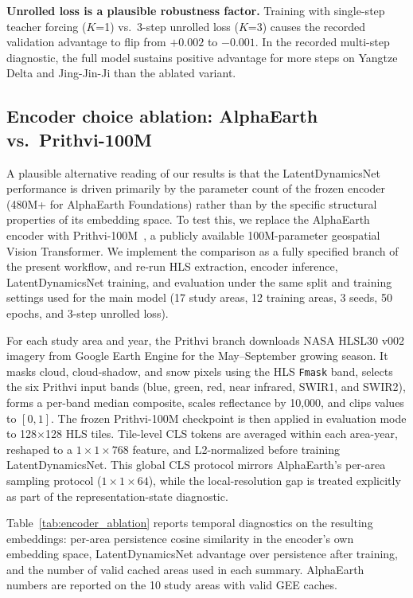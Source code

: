 \documentclass{article}
\begin{document}
\textbf{Unrolled loss is a plausible robustness factor.} Training with single-step teacher forcing ($K$=1) vs.\ 3-step unrolled loss ($K$=3) causes the recorded validation advantage to flip from $+0.002$ to $-0.001$. In the recorded multi-step diagnostic, the full model sustains positive advantage for more steps on Yangtze Delta and Jing-Jin-Ji than the ablated variant.

\subsection{Encoder choice ablation: AlphaEarth vs.\ Prithvi-100M}
\label{sec:encoder_ablation}

A plausible alternative reading of our results is that the LatentDynamicsNet performance is driven primarily by the parameter count of the frozen encoder (480M+ for AlphaEarth Foundations) rather than by the specific structural properties of its embedding space. To test this, we replace the AlphaEarth encoder with Prithvi-100M~\citep{jakubik2024prithvi}, a publicly available 100M-parameter geospatial Vision Transformer. We implement the comparison as a fully specified branch of the present workflow, and re-run HLS extraction, encoder inference, LatentDynamicsNet training, and evaluation under the same split and training settings used for the main model (17 study areas, 12 training areas, 3 seeds, 50 epochs, and 3-step unrolled loss).

For each study area and year, the Prithvi branch downloads NASA HLSL30 v002 imagery from Google Earth Engine for the May--September growing season. It masks cloud, cloud-shadow, and snow pixels using the HLS \texttt{Fmask} band, selects the six Prithvi input bands (blue, green, red, near infrared, SWIR1, and SWIR2), forms a per-band median composite, scales reflectance by 10{,}000, and clips values to $[0,1]$. The frozen Prithvi-100M checkpoint is then applied in evaluation mode to 128$\times$128 HLS tiles. Tile-level CLS tokens are averaged within each area-year, reshaped to a $1 \times 1 \times 768$ feature, and L2-normalized before training LatentDynamicsNet. This global CLS protocol mirrors AlphaEarth's per-area sampling protocol ($1 \times 1 \times 64$), while the local-resolution gap is treated explicitly as part of the representation-state diagnostic.

Table~\ref{tab:encoder_ablation} reports temporal diagnostics on the resulting embeddings: per-area persistence cosine similarity in the encoder's own embedding space, LatentDynamicsNet advantage over persistence after training, and the number of valid cached areas used in each summary. AlphaEarth numbers are reported on the 10 study areas with valid GEE caches.
\end{document}
